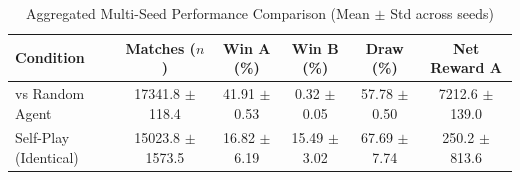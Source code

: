 \begin{table}[htbp]
    \centering
    \caption{Aggregated Multi-Seed Performance Comparison (Mean $\pm$ Std across seeds)}
    \label{tab:marl_summary_comparison}
    \begin{tabular}{lccccc}
        \toprule
        \textbf{Condition} & \textbf{Matches ($n$)} & \textbf{Win A (\%)} & \textbf{Win B (\%)} & \textbf{Draw (\%)} & \textbf{Net Reward A} \\
        \midrule
        vs Random Agent & 17341.8 $\pm$ 118.4 & 41.91 $\pm$ 0.53 & 0.32 $\pm$ 0.05 & 57.78 $\pm$ 0.50 & 7212.6 $\pm$ 139.0 \\
        Self-Play (Identical) & 15023.8 $\pm$ 1573.5 & 16.82 $\pm$ 6.19 & 15.49 $\pm$ 3.02 & 67.69 $\pm$ 7.74 & 250.2 $\pm$ 813.6 \\
        \bottomrule
    \end{tabular}
\end{table}
